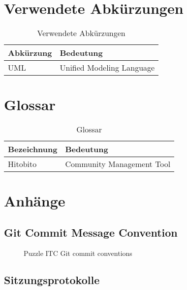 \chapter{Verwendete Abkürzungen}

\begin{table}[H]
    \begin{tabular}{|L{0.3\textwidth}|L{0.6\textwidth}|}
        \hline
         \textbf{\color{white}Abkürzung} & \textbf{\color{white}Bedeutung} \\[12pt]
        \hline
        UML & Unified Modeling Language \\
        \hline
    \end{tabular}
    \caption{Verwendete Abkürzungen}
\end{table}

\chapter{Glossar}

\begin{table}[H]
    \begin{tabular}{|L{0.3\textwidth}|L{0.6\textwidth}|}
        \hline
         \textbf{\color{white}Bezeichnung} & \textbf{\color{white}Bedeutung} \\[12pt]
        \hline
        Hitobito & Community Management Tool \\
        \hline
    \end{tabular}
    \caption{Glossar}
\end{table}

\chapter{Anhänge}

\section{Git Commit Message Convention}
\label{sec:gitconv}
\begin{figure}[h]
    \centering
    \caption{Puzzle ITC Git commit conventions}
\end{figure}

\section{Sitzungsprotokolle}
